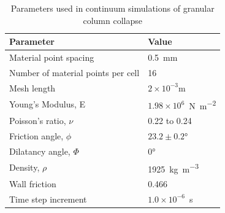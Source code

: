 \begin{table}
\caption{Parameters used in continuum simulations of granular column collapse}
\label{table:MPMData}
\centering
\begin{tabular}{ll}
\toprule
\textbf{Parameter} & \textbf{Value} \\ \midrule
Material point spacing & 0.5~\si{\mm} \\
Number of material points per cell & 16 \\
Mesh length & $2\times10^{-3}\si{\m}$  \\
Young's Modulus, E & $1.98 \times 10 ^{6}$~\si{\N\per\m\squared} \\
Poisson's ratio, $\nu$ & 0.22 to 0.24 \\ 
Friction angle, $\phi$ & $23.2 \pm 0.2\si{\degree}$ \\
Dilatancy angle, $\varPhi$ & $0$\si{\degree} \\
Density, $\rho$ & 1925~\si{\kg\per\m\cubed}\\
Wall friction & 0.466 \\
Time step increment & $1.0 \times 10^{-6}$~\si{\second}\\ \bottomrule
\end{tabular}
\end{table}

